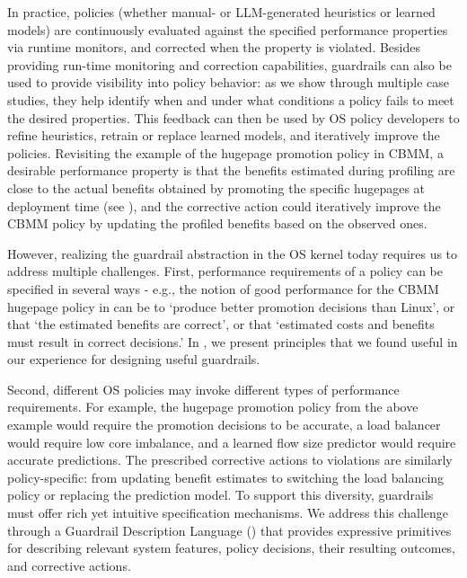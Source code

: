 In practice, policies (whether manual- or LLM-generated heuristics or learned models) are continuously evaluated against the specified performance properties via runtime monitors, and corrected when the property is violated.
Besides providing run-time monitoring and correction capabilities, guardrails can also be used to provide visibility into policy behavior: as we show through multiple case studies, they help identify when and under what conditions a policy fails to meet the desired properties.
This feedback can then be used by OS policy developers to refine heuristics, retrain or replace learned models, and iteratively improve the policies.
Revisiting the example of the hugepage promotion policy in CBMM, a desirable performance property is that the benefits estimated during profiling are close to the actual benefits obtained by promoting the specific hugepages at deployment time (see ), and the corrective action could iteratively improve the CBMM policy by updating the profiled benefits based on the observed ones. 

However, realizing the guardrail abstraction in the OS kernel today requires us to address multiple challenges.
First, performance requirements of a policy can be specified in several ways - e.g., the notion of good performance for the CBMM hugepage policy in  can be to `produce better promotion decisions than Linux', or that `the estimated benefits are correct', or that `estimated costs and benefits must result in correct decisions.'
In , we present principles that we found useful in our experience for designing useful guardrails.

Second, different OS policies may invoke different types of performance requirements. For example, the hugepage promotion policy from the above example would require the promotion decisions to be accurate, a load balancer would require low core imbalance, and a learned flow size predictor would require accurate predictions.
The prescribed corrective actions to violations are similarly policy-specific: from updating benefit estimates to switching the load balancing policy or replacing the prediction model.
To support this diversity, guardrails must offer rich yet intuitive specification mechanisms. We address this challenge through a Guardrail Description Language (\lang) that provides expressive primitives for describing relevant system features, policy decisions, their resulting outcomes, and corrective actions.

